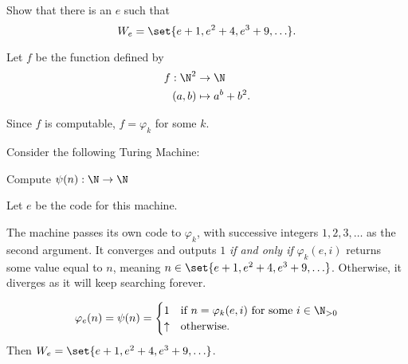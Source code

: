 \begin{problem}
  Show that there is an $e$ such that
  \[
    W_e = \set{ e+1, e^2+4, e^3+9, \ldots }.
  \]

  \begin{answer}
    Let $f$ be the function defined by
    \begin{align*}
      f : \N^2 &\to \N \\
      (a, b) &\mapsto a^b + b^2.
    \end{align*}

    Since $f$ is computable, $f = \varphi_k$ for some $k$.

    Consider the following Turing Machine:

    \step
    \begin{algorithm}[H]\label{tm:7.1}
      \caption{Compute $\psi(n) : \N \to \N$}
      Let $e$ be the code for this machine. \\
    \end{algorithm}

    The machine passes its own code to $\varphi_k$,
    with successive integers $1, 2, 3, \ldots$ as the second argument.
    It converges and outputs $1$ \emph{if and only if} $\varphi_k(e, i)$
    returns some value equal to $n$, meaning $n \in \set{ e+1, e^2+4, e^3+9, \ldots}$.
    Otherwise, it diverges as it will keep searching forever.

    \[
      \varphi_e(n) = \psi(n) = \begin{cases}
        1 & \text{if $n = \varphi_k(e, i)$ for some $i \in \N_{> 0}$} \\
        \uparrow & \text{otherwise}.
      \end{cases}
    \] Then $W_e = \set{ e+1, e^2+4, e^3+9, \ldots }$.
  \end{answer}
\end{problem}
